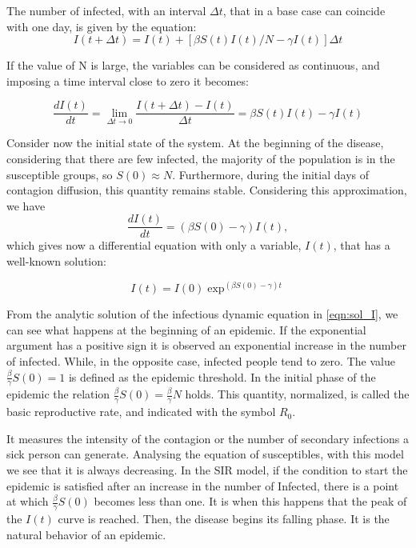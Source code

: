 The number of infected, with an interval  $\Delta t$, that in a base case can coincide with one day, is given by the equation:
\begin{equation}
	I(t+\Delta t) = I(t) + [\beta S(t)I(t)/N - \gamma I(t)]\Delta t
\end{equation}

If the value of N is large, the variables can be considered as continuous, and imposing a time interval close to zero it becomes:

\begin{equation}
	\frac{d I(t)}{dt} = \lim_{\Delta t \rightarrow  0} \frac{I(t+\Delta t)-I(t)}{\Delta t} = \beta S(t) I(t)- \gamma I(t)
\end{equation}

Consider now the initial state of the system. At the beginning of the disease, considering that there are few infected, the majority of the population is in the susceptible groups, so $S(0) \approx N$. Furthermore, during the initial days of contagion diffusion, this quantity remains stable. Considering this approximation, we have 
\begin{equation}
	\frac{d I(t)}{dt} = (\beta S(0)-\gamma)I(t),
\end{equation} 
which gives now a differential equation with only a variable, $I(t)$, that has a well-known solution:

\begin{equation}
	I(t) = I(0) \exp ^{(\beta S(0)- \gamma)t}
	\label{eqn:sol_I}
\end{equation}



From the analytic solution of the infectious dynamic equation in \ref{eqn:sol_I}, we can see what happens at the beginning of an epidemic.  If the exponential argument has a positive sign it is observed an exponential increase in the number of infected. While, in the opposite case, infected people tend to zero. 
The value $\frac{ \beta}{\gamma} S(0) = 1$ is defined as the epidemic threshold. In the initial phase of the epidemic the relation $\frac{ \beta}{\gamma} S(0) = \frac{ \beta}{\gamma} N $  holds. 
This quantity, normalized, is called the basic reproductive rate, and indicated with the symbol $R_0$.

It measures the intensity of the contagion or the number of secondary infections a sick person can generate. Analysing the equation of susceptibles, with this model we see that it is always decreasing. In the SIR model, if the condition to start the epidemic is satisfied after an increase in the number of Infected, there is a point at which $\frac { \beta}{\gamma} S(0)$ becomes less than one. It is when this happens that the peak of the $I(t)$ curve is reached. Then, the disease begins its falling phase. It is the natural behavior of an epidemic.

